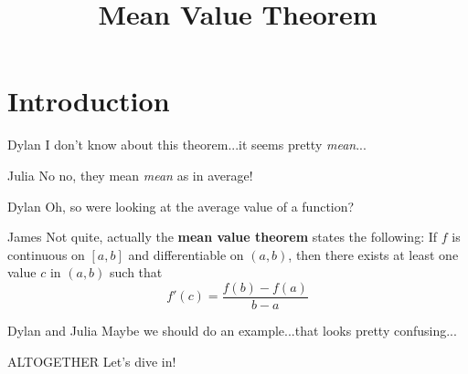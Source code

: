 \documentclass{ximera}
\title{Mean Value Theorem}
\begin{document}
\maketitle
\section{Introduction}
\begin{dialogue}
\item[Dylan] I don't know about this theorem...it seems pretty \textit{mean}...
\item[Julia] No no, they mean \textit{mean} as in average!
\item[Dylan] Oh, so were looking at the average value of a function?
\item[James] Not quite, actually the \textbf{mean value theorem} states the following: If $f$ is continuous on $[a,b]$ and differentiable on $(a,b)$, then there exists at least one value $c$ in $(a,b)$ such that $$f'(c)=\frac{f(b)-f(a)}{b-a}$$
\item[Dylan and Julia] Maybe we should do an example...that looks pretty confusing...
\item[ALTOGETHER] Let's dive in!
\end{dialogue}
\end{document}
